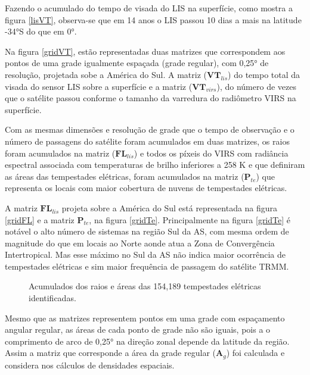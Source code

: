 Fazendo o acumulado do tempo de visada do LIS na superfície, como mostra a figura \ref{lisVT}, observa-se que em 14 anos o LIS passou 10 dias a mais na latitude -34°S do que em 0°.

Na figura \ref{gridVT}, estão representadas duas matrizes que correspondem aos pontos de uma grade igualmente espaçada (grade regular), com 0,25° de resolução, projetada sobe a América do Sul. A matriz ($\mathbf{VT}_{lis}$) do tempo total da visada do sensor LIS sobre a superfície e a matriz ($\mathbf{VT}_{virs}$), do número de vezes que o satélite passou conforme o tamanho da varredura do radiômetro VIRS na superfície.  


Com as mesmas dimensões e resolução de grade que o tempo de observação e o número de passagens do satélite foram acumulados em duas matrizes, os raios foram acumulados na matriz ($\mathbf{FL}_{lis}$) e todos os píxeis do VIRS com radiância espectral associada com temperaturas de brilho inferiores a 258 K e que definiram as áreas das tempestades elétricas, foram acumulados na matriz ($\mathbf{P}_{te}$) que representa os locais com maior cobertura de nuvens de tempestades elétricas.

A matriz $\mathbf{FL}_{lis}$ projeta sobre a América do Sul está representada na figura \ref{gridFL} e a matriz $\mathbf{P}_{te}$, na figura \ref{gridTe}. Principalmente na figura \ref{gridTe} é notável o alto número de sistemas na região Sul da AS, com mesma ordem de magnitude do que em locais ao Norte aonde atua a Zona de Convergência Intertropical. Mas esse máximo no Sul da AS não indica maior ocorrência de tempestades elétricas e sim maior frequência de passagem do satélite TRMM.

\begin{figure}[hbp]

\caption{Acumulados dos raios e áreas das 154,189 tempestades elétricas identificadas.}
\label{gridSistemas} 
\end{figure} 

Mesmo que as matrizes representem pontos em uma grade com espaçamento angular regular, as áreas de cada ponto de grade não são iguais, pois a  o comprimento de arco de 0,25° na direção zonal depende da latitude da região. Assim a matriz que corresponde a área da grade regular ($\mathbf{A}_g$) foi calculada e considera nos cálculos de densidades espaciais.


